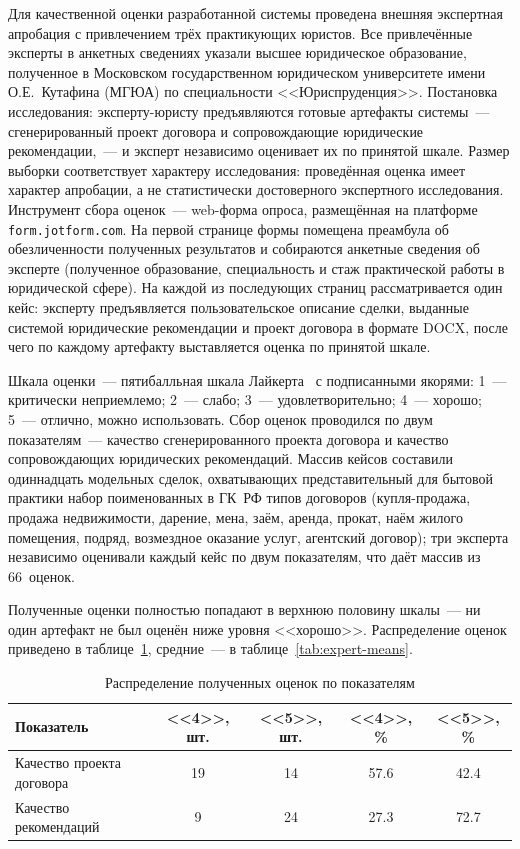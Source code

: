 Для качественной оценки разработанной системы проведена внешняя экспертная апробация с привлечением трёх практикующих юристов. Все привлечённые эксперты в анкетных сведениях указали высшее юридическое образование, полученное в Московском государственном юридическом университете имени О.Е.~Кутафина (МГЮА) по специальности <<Юриспруденция>>. Постановка исследования: эксперту-юристу предъявляются готовые артефакты системы~--- сгенерированный проект договора и сопровождающие юридические рекомендации,~--- и эксперт независимо оценивает их по принятой шкале. Размер выборки соответствует характеру исследования: проведённая оценка имеет характер апробации, а не статистически достоверного экспертного исследования. Инструмент сбора оценок~--- web-форма опроса, размещённая на платформе \texttt{form.jotform.com}. На первой странице формы помещена преамбула об обезличенности полученных результатов и собираются анкетные сведения об эксперте (полученное образование, специальность и стаж практической работы в юридической сфере). На каждой из последующих страниц рассматривается один кейс: эксперту предъявляется пользовательское описание сделки, выданные системой юридические рекомендации и проект договора в формате DOCX, после чего по каждому артефакту выставляется оценка по принятой шкале.

Шкала оценки~--- пятибалльная шкала Лайкерта~\cite{likert1932} с подписанными якорями: 1~--- критически неприемлемо; 2~--- слабо; 3~--- удовлетворительно; 4~--- хорошо; 5~--- отлично, можно использовать. Сбор оценок проводился по двум показателям~--- качество сгенерированного проекта договора и качество сопровождающих юридических рекомендаций. Массив кейсов составили одиннадцать модельных сделок, охватывающих представительный для бытовой практики набор поименованных в ГК~РФ типов договоров (купля-продажа, продажа недвижимости, дарение, мена, заём, аренда, прокат, наём жилого помещения, подряд, возмездное оказание услуг, агентский договор); три эксперта независимо оценивали каждый кейс по двум показателям, что даёт массив из 66~оценок.

Полученные оценки полностью попадают в верхнюю половину шкалы~--- ни один артефакт не был оценён ниже уровня <<хорошо>>. Распределение оценок приведено в таблице~\ref{tab:expert-distribution}, средние~--- в таблице~\ref{tab:expert-means}.

\begin{table}[H]
\caption{Распределение полученных оценок по показателям}
\label{tab:expert-distribution}
\renewcommand{\arraystretch}{1.20}
\begin{tabularx}{\textwidth}{|>{\raggedright\arraybackslash}X|c|c|c|c|} \hline
\textbf{Показатель} & \textbf{<<4>>, шт.} & \textbf{<<5>>, шт.} & \textbf{<<4>>, \%} & \textbf{<<5>>, \%} \\ \hline
Качество проекта договора & 19 & 14 & 57.6 & 42.4 \\ \hline
Качество рекомендаций & 9 & 24 & 27.3 & 72.7 \\ \hline
\end{tabularx}
\end{table}

